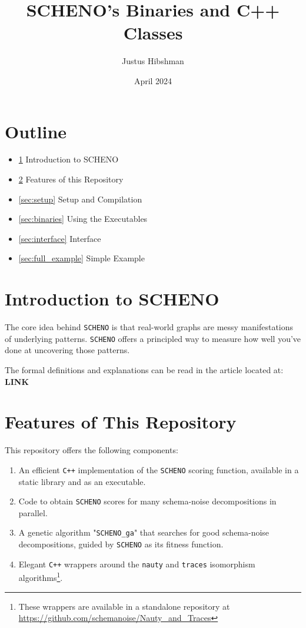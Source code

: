 \documentclass{article}
\begin{document}
\title{SCHENO's Binaries and C++ Classes}

\author{Justus Hibshman}

\date{April 2024}

\maketitle

\vspace{2cm}

\section*{Outline}

\begin{itemize}
    \item \ref{sec:nt_intro} Introduction to SCHENO
    \item \ref{sec:features} Features of this Repository
    \item \ref{sec:setup} Setup and Compilation
    \item \ref{sec:binaries} Using the Executables
    \item \ref{sec:interface} Interface
    \item \ref{sec:full_example} Simple Example
\end{itemize}


\newpage

\section{Introduction to SCHENO}\label{sec:nt_intro}

The core idea behind \verb|SCHENO| is that real-world graphs are messy manifestations of underlying patterns. \verb|SCHENO| offers a principled way to measure how well you've done at uncovering those patterns.

The formal definitions and explanations can be read in the article located at: \textbf{LINK}

\section{Features of This Repository}\label{sec:features}

This repository offers the following components:

\begin{enumerate}
    \item An efficient \verb|C++| implementation of the \verb|SCHENO| scoring function, available in a static library and as an executable.
    \item Code to obtain \verb|SCHENO| scores for many schema-noise decompositions in parallel.
    \item A genetic algorithm "\verb|SCHENO_ga|" that searches for good schema-noise decompositions, guided by \verb|SCHENO| as its fitness function.
    \item Elegant \verb|C++| wrappers around the \verb|nauty| and \verb|traces| isomorphism algorithms\footnote{These wrappers are available in a standalone repository at \url{https://github.com/schemanoise/Nauty_and_Traces}}.
\end{enumerate}
\end{document}
